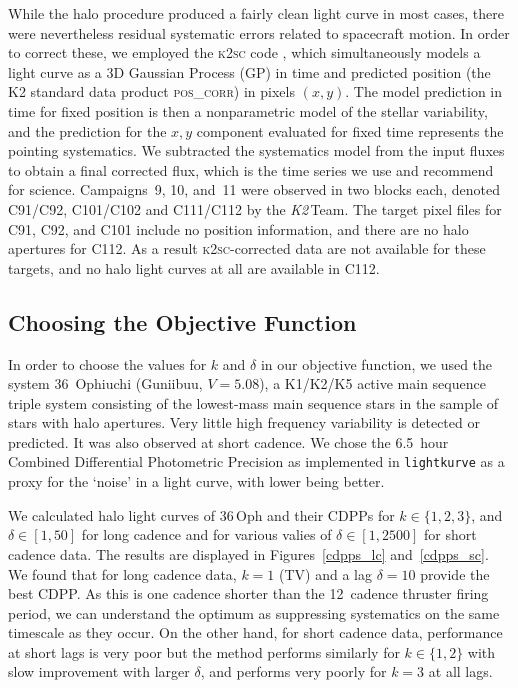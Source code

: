 \documentclass[modern]{aastex62}
\newcommand\ktwo{\emph{K2}\,}
\begin{document}
While the halo procedure produced a fairly clean light curve in most cases, there were nevertheless residual systematic errors related to spacecraft motion. In order to correct these, we employed the \textsc{k2sc} code \citep{Aigrain2015,k2sc}, which simultaneously models a light curve as a 3D Gaussian Process (GP) in time and predicted position (the K2 standard data product \textsc{pos\_corr}) in pixels $(x,y)$. The model prediction in time for fixed position is then a nonparametric model of the stellar variability, and the prediction for the $x,y$ component evaluated for fixed time represents the pointing systematics. We subtracted the systematics model from the input fluxes to obtain a final corrected flux, which is the time series we use and recommend for science. Campaigns~9, 10, and~11 were observed in two blocks each, denoted C91/C92, C101/C102 and C111/C112 by the \ktwo Team. The target pixel files for C91, C92, and C101 include no position information, and there are no halo apertures for C112. As a result \textsc{k2sc}-corrected data are not available for these targets, and no halo light curves at all are available in C112.

\subsection{Choosing the Objective Function}
\label{sec:objective}

In order to choose the values for $k$ and $\delta$ in our objective function, we used the system 36~Ophiuchi (Guniibuu, $V= 5.08$), a K1/K2/K5 active main sequence triple system consisting of the lowest-mass main sequence stars in the sample of stars with halo apertures. Very little high frequency variability is detected or predicted. It was also observed at short cadence. We chose the 6.5~hour Combined Differential Photometric Precision \citep[CDPP,][]{cdpp} as implemented in \texttt{lightkurve} as a proxy for the `noise' in a light curve, with lower being better. 

We calculated halo light curves of 36\,Oph and their CDPPs for $k \in \{1,2,3\}$, and $\delta \in [1,50]$ for long cadence and for various valies of $\delta \in [1,2500]$ for short cadence data. The results are displayed in Figures~\ref{cdpps_lc} and~\ref{cdpps_sc}. We found that for long cadence data, $k=1$ (TV) and a lag $\delta=10$ provide the best CDPP. As this is one cadence shorter than the 12~cadence thruster firing period, we can understand the optimum as suppressing systematics on the same timescale as they occur. On the other hand, for short cadence data, performance at short lags is very poor but the method performs similarly for $k \in \{1,2\}$ with slow improvement with larger $\delta$, and performs very poorly for $k=3$ at all lags. 
\end{document}
